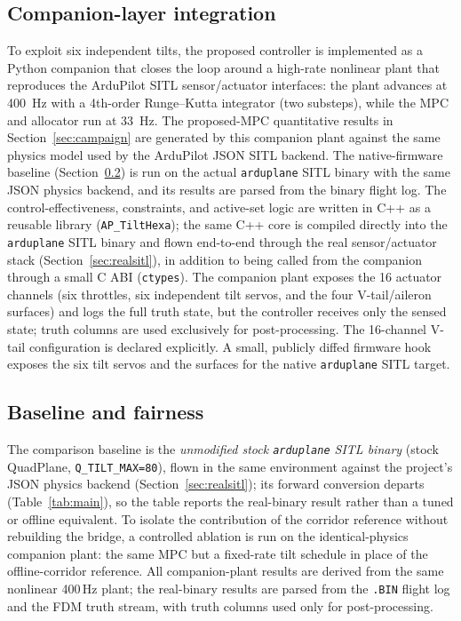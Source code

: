 \documentclass[preprint,3p,11pt]{elsarticle}
\begin{document}
\subsection{Companion-layer integration}\label{sec:companion}
To exploit six independent tilts, the proposed controller is implemented as a
Python companion that closes the loop around a high-rate nonlinear plant
that reproduces the ArduPilot SITL sensor/actuator interfaces: the plant
advances at 400~Hz with a 4th-order Runge--Kutta integrator (two substeps),
while the MPC and allocator run at 33~Hz. The proposed-MPC quantitative
results in Section~\ref{sec:campaign} are generated by this companion plant
against the same physics model used by the ArduPilot JSON SITL backend. The
native-firmware baseline (Section~\ref{sec:baseline}) is run on the actual
\texttt{arduplane} SITL binary with the same JSON physics backend, and its
results are parsed from the binary flight log. The
control-effectiveness, constraints, and active-set logic are written in C++
as a reusable library (\texttt{AP\_TiltHexa}); the same C++ core is compiled
directly into the \texttt{arduplane} SITL binary and flown end-to-end through
the real sensor/actuator stack (Section~\ref{sec:realsitl}), in addition to
being called from the companion through a small C ABI (\texttt{ctypes}). The companion plant exposes the 16 actuator channels (six
throttles, six independent tilt servos, and the four V-tail/aileron
surfaces) and logs the full truth state, but the controller receives only
the sensed state; truth columns are used exclusively for post-processing.
The 16-channel V-tail configuration is declared explicitly. A small,
publicly diffed firmware hook exposes the six tilt servos and the surfaces
for the native \texttt{arduplane} SITL target.

\subsection{Baseline and fairness}\label{sec:baseline}
The comparison baseline is the \emph{unmodified stock \texttt{arduplane} SITL
binary} (stock QuadPlane, \texttt{Q\_TILT\_MAX=80}), flown in the same
environment against the project's JSON physics backend
(Section~\ref{sec:realsitl}); its forward conversion departs
(Table~\ref{tab:main}), so the table reports the real-binary result rather than
a tuned or offline equivalent. To isolate the contribution of the corridor
reference without rebuilding the bridge, a controlled ablation is run on the
identical-physics companion plant: the same MPC but a fixed-rate tilt schedule in
place of the offline-corridor reference. All companion-plant results are derived
from the same nonlinear 400\,Hz plant; the real-binary results are parsed from
the \texttt{.BIN} flight log and the FDM truth stream, with truth columns used
only for post-processing.
\end{document}

